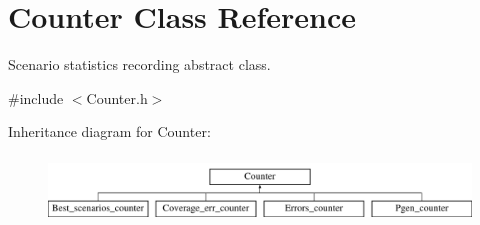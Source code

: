\hypertarget{classCounter}{}\section{Counter Class Reference}
\label{classCounter}


Scenario statistics recording abstract class.  




{\ttfamily \#include $<$Counter.\+h$>$}

Inheritance diagram for Counter\+:\begin{figure}[H]
\begin{center}
\leavevmode
\includegraphics[height=1.794872cm]{d1/d24/classCounter}
\end{center}
\end{figure}
